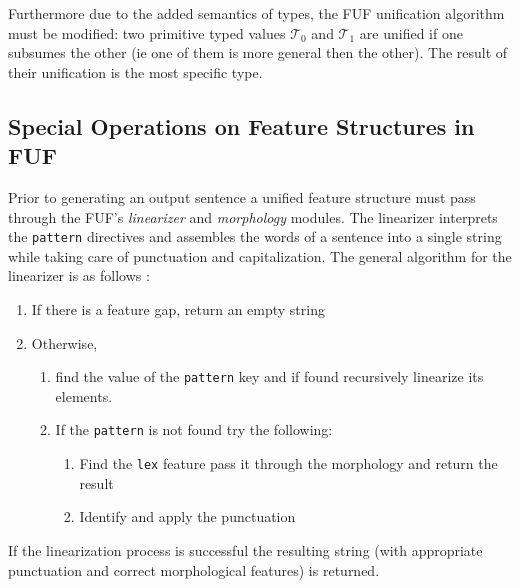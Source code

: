 \documentclass[12pt]{article}
\begin{document}
{Furthermore due to the added semantics of types, the FUF unification algorithm must be modified:  two primitive
typed values $\mathcal{T}_0$ and $\mathcal{T}_1$ are unified if one subsumes the other
(ie one of them is more general then the other). The result of their unification 
is the most specific type. 

\subsection{Special Operations on Feature Structures in FUF}
Prior to generating an output sentence a unified feature structure must pass through the 
FUF's \textit{linearizer} and \textit{morphology} modules.
The linearizer interprets the \texttt{pattern} directives and assembles the words of a sentence 
into a single string while taking care of punctuation and capitalization. The general algorithm
for the linearizer is as follows \cite{fuf-man}:
\begin{enumerate}
    \item If there is a feature gap, return an empty string 
    \item Otherwise, 
        \begin{enumerate}
            \item find the value of the \texttt{pattern} key and if found
                recursively linearize its elements.
            \item  If the \texttt{pattern} is not found try the following:
                \begin{enumerate}
                    \item Find the \texttt{lex} feature pass it through the morphology and return
                        the result
                    \item Identify and apply the punctuation
                \end{enumerate}
        \end{enumerate}
\end{enumerate}

If the linearization process is successful the resulting string (with appropriate punctuation and
correct morphological features) is returned.

}
\end{document}
